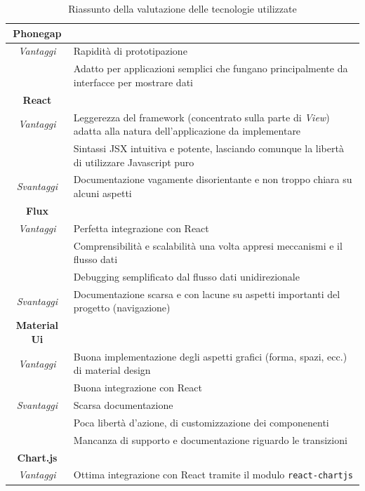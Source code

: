\begin{table} [H] \centering
\begin{tabularx}{\textwidth}{|c|X|}
\hline
\textbf{Phonegap} & \\ \hline
\textit{Vantaggi}
& Rapidità di prototipazione \\ \hline
& Adatto per applicazioni semplici che fungano principalmente da interfacce per mostrare dati \\ \hline \hline
\textbf{React} & \\ \hline
\textit{Vantaggi}
& Leggerezza del framework (concentrato sulla parte di \textit{View}) adatta alla natura dell'applicazione da implementare \\ \hline
& Sintassi JSX intuitiva e potente, lasciando comunque la libertà di utilizzare Javascript puro \\ \hline
\textit{Svantaggi}
& Documentazione vagamente disorientante e non troppo chiara su alcuni aspetti \\ \hline \hline
\textbf{Flux} & \\ \hline
\textit{Vantaggi}
& Perfetta integrazione con React \\ \hline
& Comprensibilità e scalabilità una volta appresi meccanismi e il flusso dati \\ \hline
& Debugging semplificato dal flusso dati unidirezionale \\ \hline 
\textit{Svantaggi}
& Documentazione scarsa e con lacune su aspetti importanti del progetto (navigazione) \\ \hline
\hline
\textbf{Material Ui} & \\ \hline
\textit{Vantaggi}
& Buona implementazione degli aspetti grafici (forma, spazi, ecc.) di material design \\ \hline
& Buona integrazione con React \\ \hline
\textit{Svantaggi}
& Scarsa documentazione \\ \hline
& Poca libertà d'azione, di customizzazione dei componenenti \\ \hline
& Mancanza di supporto e documentazione riguardo le transizioni \\ \hline \hline
\textbf{Chart.js} & \\ \hline
\textit{Vantaggi}
& Ottima integrazione con React tramite il modulo \texttt{react-chartjs} \\ \hline
\end{tabularx}
\caption{Riassunto della valutazione delle tecnologie utilizzate}
\end{table}